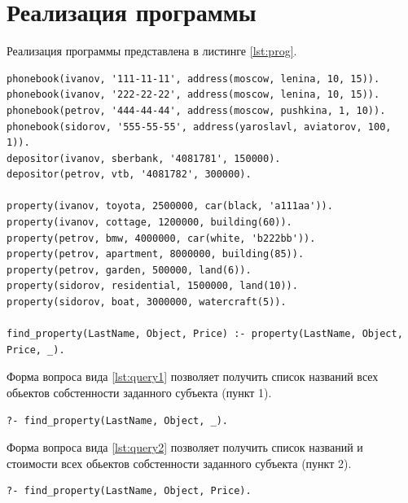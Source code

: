 \section{Реализация программы}

Реализация программы представлена в листинге \ref{lst:prog}.

\begin{lstlisting}[caption={Реализация программы <<Собственники>>}, label={lst:prog}]
phonebook(ivanov, '111-11-11', address(moscow, lenina, 10, 15)).
phonebook(ivanov, '222-22-22', address(moscow, lenina, 10, 15)).
phonebook(petrov, '444-44-44', address(moscow, pushkina, 1, 10)).
phonebook(sidorov, '555-55-55', address(yaroslavl, aviatorov, 100, 1)).
depositor(ivanov, sberbank, '4081781', 150000).
depositor(petrov, vtb, '4081782', 300000).

property(ivanov, toyota, 2500000, car(black, 'a111aa')).
property(ivanov, cottage, 1200000, building(60)).
property(petrov, bmw, 4000000, car(white, 'b222bb')).
property(petrov, apartment, 8000000, building(85)).
property(petrov, garden, 500000, land(6)).
property(sidorov, residential, 1500000, land(10)).
property(sidorov, boat, 3000000, watercraft(5)).

find_property(LastName, Object, Price) :- property(LastName, Object, Price, _).
\end{lstlisting}

Форма вопроса вида \ref{lst:query1} позволяет получить список названий всех обьектов собстенности заданного субъекта (пункт 1).
\begin{lstlisting}[caption={Форма задания вопроса 1}, label={lst:query1}]
?- find_property(LastName, Object, _).
\end{lstlisting}

Форма вопроса вида \ref{lst:query2} позволяет получить список названий и стоимости всех обьектов собстенности заданного субъекта (пункт 2).
\begin{lstlisting}[caption={Форма задания вопроса 2}, label={lst:query2}]
?- find_property(LastName, Object, Price).
\end{lstlisting}
